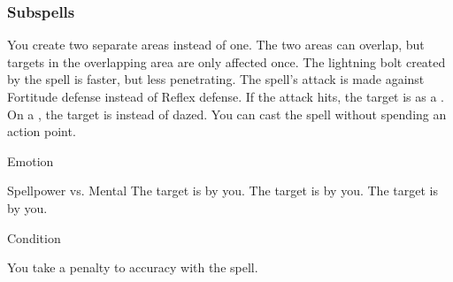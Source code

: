 \subsubsection{Subspells}
You create two separate areas instead of one.
The two areas can overlap, but targets in the overlapping area are only affected once.
The lightning bolt created by the spell is faster, but less penetrating.
The spell's attack is made against Fortitude defense instead of Reflex defense.
If the attack hits, the target is  as a .
On a , the target is  instead of dazed.
You can cast the spell without spending an action point.
\begin{spellsection}{Emotion}
\begin{spellheader}
\end{spellheader}
\begin{spellcontent}
\begin{spelltargetinginfo}
\end{spelltargetinginfo}
\begin{spelleffects}
\begin{spellattack}{Spellpower vs. Mental}
\spellsuccess The target is \frightened by you.
\spellcritical The target is \panicked by you.
\spellfailure The target is \shaken by you.
\end{spellattack}
\spelldur Condition
\end{spelleffects}
\end{spellcontent}
\begin{spellfooter}
\end{spellfooter}
\begin{spellsubcontent}
\begin{spellcantrip}
You take a  penalty to accuracy with the spell.
\end{spellcantrip}
\end{spellsubcontent}
\end{spellsection}

